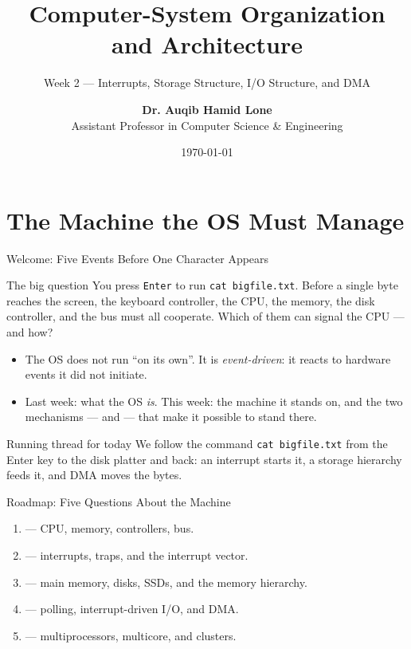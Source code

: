 \documentclass[aspectratio=169]{beamer}
\title{Computer-System Organization and Architecture}
\subtitle{Week 2 --- Interrupts, Storage Structure, I/O Structure, and DMA}
\author[Dr. Auqib Hamid Lone]{%
  \textbf{Dr. Auqib Hamid Lone}\\
  \small Assistant Professor in Computer Science \& Engineering
}
\institute[GCET Ganderbal]{%
  \small\textbf{PCC CS-502: Operating Systems}\\[0.3em]
  Department of Computer Science \& Engineering\\
  Government College of Engineering \& Technology (GCET), Ganderbal
}
\date[\today]{\small\today}
\begin{document}
\frame{\titlepage}

\section{The Machine the OS Must Manage}

\begin{frame}{Welcome: Five Events Before One Character Appears}
  \begin{block}{The big question}
    You press \texttt{Enter} to run \texttt{cat bigfile.txt}. Before a single
    byte reaches the screen, the keyboard controller, the CPU, the memory, the
    disk controller, and the bus must all cooperate. Which of them can signal
    the CPU --- and how?
  \end{block}
  \begin{itemize}
    \item The OS does not run ``on its own''. It is \emph{event-driven}: it
      reacts to hardware events it did not initiate.
    \item Last week: what the OS \emph{is}. This week: the machine it stands on,
      and the two mechanisms ---  and  --- that make it
      possible to stand there.
  \end{itemize}
  \vspace{0.15cm}
  \begin{alertblock}{Running thread for today}
    We follow the command \texttt{cat bigfile.txt} from the Enter key to the
    disk platter and back: an interrupt starts it, a storage hierarchy feeds it,
    and DMA moves the bytes.
  \end{alertblock}
\end{frame}

\begin{frame}{Roadmap: Five Questions About the Machine}
  \begin{enumerate}
    \item {} --- CPU, memory, controllers, bus.
    \item {} --- interrupts,
      traps, and the interrupt vector.
    \item {} --- main memory, disks, SSDs, and the
      memory hierarchy.
    \item {} --- polling, interrupt-driven I/O, and DMA.
    \item {} --- multiprocessors, multicore, and
      clusters.
  \end{enumerate}
  \vspace{0.2cm}
\end{frame}
\end{document}
